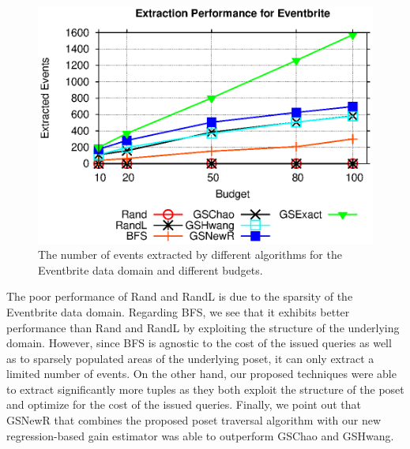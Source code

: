 \begin{figure}[h]
	\begin{center}
	\includegraphics[clip,scale=0.5]{figs/ebExtractionAll.eps}
	\caption{The number of events extracted by different algorithms for the Eventbrite data domain and different budgets.}
	\label{fig:ebextraction}
	\end{center}
	\vspace{-15pt}
\end{figure}


The poor performance of Rand and RandL is due to the sparsity of the Eventbrite data domain. Regarding BFS, we see that it exhibits better performance than Rand and RandL by exploiting the structure of the underlying domain. However, since BFS is agnostic to the cost of the issued queries as well as to sparsely populated areas of the underlying poset, it can only extract a limited number of events. On the other hand, our proposed techniques were able to extract significantly more tuples as they both exploit the structure of the poset and optimize for the cost of the issued queries. Finally, we point out that GSNewR that combines the proposed poset traversal algorithm with our new regression-based gain estimator was able to outperform GSChao and GSHwang. 

